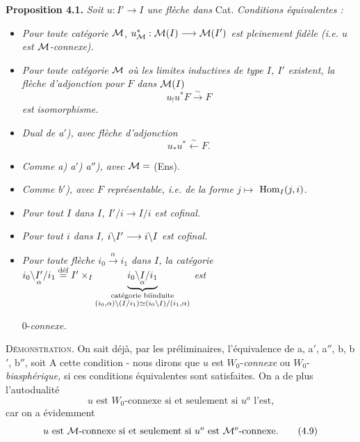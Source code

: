 \noindent\textbf{Proposition 4.1.} \textit{Soit $u : I' \longrightarrow I$ une flèche dans} Cat. \textit{Conditions équivalentes :}
\begin{itemize}[label={}]
\item[\textit{a)}] \textit{Pour toute catégorie $\mathcal{M}$, $u^*_{\mathcal{M}} : \mathcal{M}(I) \longrightarrow \mathcal{M}(I')$ est pleinement fidèle (i.e. $u$ est $\mathcal{M}$-connexe).}
\item[\textit{a$'$)}] \textit{Pour toute catégorie $\mathcal{M}$ où les limites inductives de type $I$, $I'$ existent, la flèche d'adjonction pour $F$ dans $\mathcal{M}(I)$} %
\[
u_!u^*F \xrightarrow{\sim} F
\]
\textit{est} \textit{isomorphisme.}
\item[\textit{a$''$)}] \textit{Dual de a$'$), avec} \textit{flèche d'adjonction}
\[
u_*u^* \xleftarrow{\sim} F. %
\]
\item[\textit{b) b$'$) b$''$)}] \textit{Comme a) a$'$) a$''$), avec $\mathcal{M} =$} (Ens).
\item[\textit{c)}] \textit{Comme b$'$), avec $F$ représentable, i.e. de la forme $j \longmapsto$} $\operatorname{Hom}_I(j, i)$.
\item[\textit{d)}] \textit{Pour tout $I$ dans $I$, $I'/i \longrightarrow I/i$ est cofinal.} %
\item[\textit{d$'$)}] \textit{Pour tout $i$ dans $I$, $i\backslash I' \longrightarrow i\backslash I$ est cofinal.}
\item[\textit{d$''$)}] \textit{Pour toute flèche $i_0 \xrightarrow{\alpha} i_1$ dans $I$, la catégorie} $i_0\backslash \underset{\alpha}{I'}/i_1 \overset{\text{déf}}{=} I' \times_I \underbrace{i_0\backslash \underset{\alpha}{I}/i_1}_{\substack{\text{catégorie biïnduite}\\ (i_0, \alpha)\backslash(I/i_1) \simeq (i_0\backslash I)/(i_1, \alpha)}}$ \qquad \textit{est}

0-\textit{connexe.}
\end{itemize}

\textsc{Démonstration.} On sait déjà, par les préliminaires, l'équivalence de a, a$'$, a$''$, b, b$'$, b$''$, soit A cette condition - nous dirons que $u$ est $W_0$-\textit{connexe} ou $W_0$-\textit{biasphérique,} si ces conditions équivalentes sont satisfaites. On a de plus l'autodualité
\[
\text{$u$ est $W_0$-connexe si et seulement si $u^o$ l'est,}
\tag*{(4.8)} %
\]
car on a évidemment
\[
\text{$u$ est $\cM$-connexe si et seulement si $u^o$ est $\cM^o$-connexe.}
\tag*{(4.9)}
\]


